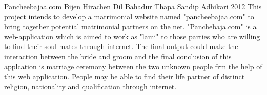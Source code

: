  \begin{conf-abstract}[]
{Pancheebajaa.com}
{
Bijen Hirachen
Dil Bahadur Thapa
Sandip Adhikari
}
{2012}
	This project intends to develop a matrimonial website named "pancheebajaa.com" to bring together
potential matrimonial partners on the net. "Panchebaja.com" is a web-application which is aimed to work
as "lami" to those parties who are willing to find their soul mates through internet. The final output 
could make the interaction between the bride and groom and the final conclusion of this applcation is marriage
ceremony between the two unknown people frm the help of this web application. People may be able to find their
life partner of distinct religion, nationality and qualification through internet.
  \end{conf-abstract}
